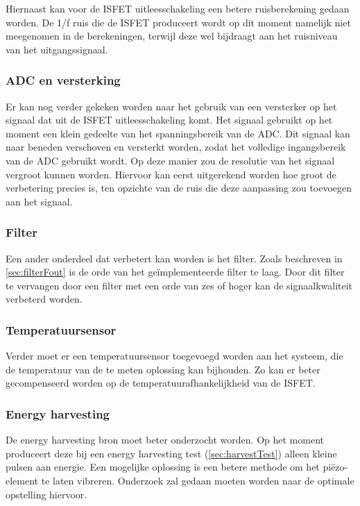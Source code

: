 Hiernaast kan voor de ISFET uitleesschakeling een betere ruisberekening gedaan worden. De 1/f ruis die de ISFET produceert wordt op dit moment namelijk niet meegenomen in de berekeningen, terwijl deze wel bijdraagt aan het ruisniveau van het uitgangssignaal.

\subsubsection*{ADC en versterking}
Er kan nog verder gekeken worden naar het gebruik van een versterker op het signaal dat uit de ISFET uitleesschakeling komt. Het signaal gebruikt op het moment een klein gedeelte van het spanningsbereik van de ADC. Dit signaal kan naar beneden verschoven en versterkt worden, zodat het volledige ingangsbereik van de ADC gebruikt wordt. Op deze manier zou de resolutie van het signaal vergroot kunnen worden.
Hiervoor kan eerst uitgerekend worden hoe groot de verbetering precies is, ten opzichte van de ruis die deze aanpassing zou toevoegen aan het signaal.

\subsubsection*{Filter}
Een ander onderdeel dat verbetert kan worden is het filter. Zoals beschreven in \cref{sec:filterFout} is de orde van het geïmplementeerde filter te laag. Door dit filter te vervangen door een filter met een orde van zes of hoger kan de signaalkwaliteit verbeterd worden.

\subsubsection*{Temperatuursensor}
Verder moet er een temperatuursensor toegevoegd worden aan het systeem, die de temperatuur van de te meten oplossing kan bijhouden. Zo kan er beter gecompenseerd worden op de temperatuurafhankelijkheid van de ISFET.

\subsubsection*{Energy harvesting}
De energy harvesting bron moet beter onderzocht worden. Op het moment produceert deze bij een energy harvesting test (\cref{sec:harvestTest}) alleen kleine pulsen aan energie. Een mogelijke oplossing is een betere methode om het piëzo-element te laten vibreren. Onderzoek zal gedaan moeten worden naar de optimale opstelling hiervoor.





